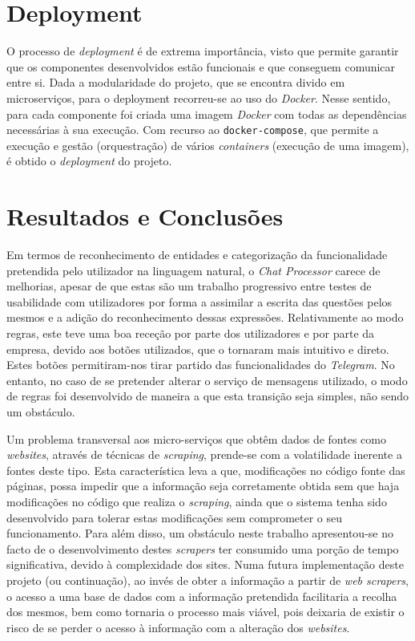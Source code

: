 \documentclass[11pt,a4paper]{article}
\begin{document}
\section{Deployment}
O processo de \textit{deployment} é de extrema importância, visto que permite garantir que os componentes
desenvolvidos estão funcionais e que conseguem comunicar entre si.  Dada a modularidade do projeto, que se
encontra divido em microserviços, para o deployment recorreu-se ao uso do \textit{Docker}. Nesse sentido,
para cada componente foi criada uma imagem \textit{Docker} com todas as dependências necessárias à sua
execução. Com recurso ao \texttt{docker-compose}, que permite a execução e gestão (orquestração) de vários
\textit{containers} (execução de uma imagem), é obtido o \textit{deployment} do projeto.

\section{Resultados e Conclusões}
Em termos de reconhecimento de entidades e categorização da funcionalidade pretendida pelo utilizador na
linguagem natural, o \textit{Chat Processor} carece de melhorias, apesar de que estas são um trabalho
progressivo entre testes de usabilidade com utilizadores por forma a assimilar a escrita das questões pelos
mesmos e a adição do reconhecimento dessas expressões. Relativamente ao modo regras, este teve uma boa
receção por parte dos utilizadores e por parte da empresa, devido aos botões utilizados, que o tornaram mais
intuitivo e direto. Estes botões permitiram-nos tirar partido das funcionalidades do \textit{Telegram}. No
entanto, no caso de se pretender alterar o serviço de mensagens utilizado, o modo de regras foi desenvolvido
de maneira a que esta transição seja simples, não sendo um obstáculo.

Um problema transversal aos micro-serviços que obtêm dados de fontes como \textit{websites}, através de
técnicas de \textit{scraping}, prende-se com a volatilidade inerente a fontes deste tipo. Esta
característica leva a que, modificações no código fonte das páginas, possa impedir que a informação seja
corretamente obtida sem que haja modificações no código que realiza o \textit{scraping}, ainda que o sistema
tenha sido desenvolvido para tolerar estas modificações sem comprometer o seu funcionamento. Para além
disso, um obstáculo neste trabalho apresentou-se no facto de o desenvolvimento destes \textit{scrapers} ter
consumido uma porção de tempo significativa, devido à complexidade dos sites. Numa futura implementação
deste projeto (ou continuação), ao invés de obter a informação a partir de \textit{web scrapers}, o acesso a
uma base de dados com a informação pretendida facilitaria a recolha dos mesmos, bem como tornaria o processo
mais viável, pois deixaria de existir o risco de se perder o acesso à informação com a alteração dos
\textit{websites}.
\end{document}
